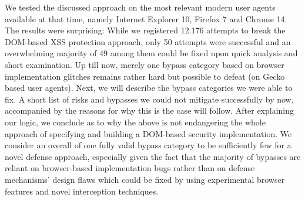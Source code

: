       We tested the discussed approach on the most relevant modern user agents available at that time, namely Internet Explorer 10, Firefox 7 and Chrome 14. The results were surprising: While we registered 12.176 attempts to break the DOM-based XSS protection approach, only 50 attempts were successful and an overwhelming majority of 49 among them could be fixed upon quick analysis and short examination. Up till now, merely one bypass category based on browser implementation glitches remains rather hard but possible to defeat (on Gecko based user agents). Next, we will describe the bypass categories we were able to fix. A short list of risks and bypasses we could not mitigate successfully by now, accompanied by the reasons for why this is the case will follow. After explaining our logic, we conclude as to why the above is not endangering the whole approach of specifying and building a DOM-based security implementation. We consider an overall of one fully valid bypass category to be sufficiently few for a novel defense approach, especially given the fact that the majority of  bypasses are reliant on browser-based implementation bugs rather than on defense mechanisms' design flaws which could be fixed by using experimental browser features and novel interception techniques.

